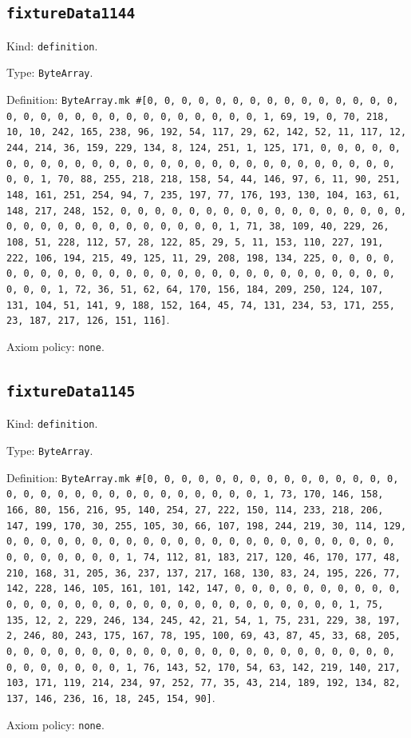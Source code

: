 \documentclass[11pt]{article}
\begin{document}
\subsection*{\texttt{fixtureData1144}}
\noindent Kind: \texttt{definition}.\par
\noindent Type: \texttt{ByteArray}.\par
\noindent Definition: \texttt{ByteArray.mk \#[0, 0, 0, 0, 0, 0, 0, 0, 0, 0, 0, 0, 0, 0, 0, 0, 0, 0, 0, 0, 0, 0, 0, 0, 0, 0, 0, 0, 0, 0, 1, 69, 19, 0, 70, 218, 10, 10, 242, 165, 238, 96, 192, 54, 117, 29, 62, 142, 52, 11, 117, 12, 244, 214, 36, 159, 229, 134, 8, 124, 251, 1, 125, 171, 0, 0, 0, 0, 0, 0, 0, 0, 0, 0, 0, 0, 0, 0, 0, 0, 0, 0, 0, 0, 0, 0, 0, 0, 0, 0, 0, 0, 0, 0, 1, 70, 88, 255, 218, 218, 158, 54, 44, 146, 97, 6, 11, 90, 251, 148, 161, 251, 254, 94, 7, 235, 197, 77, 176, 193, 130, 104, 163, 61, 148, 217, 248, 152, 0, 0, 0, 0, 0, 0, 0, 0, 0, 0, 0, 0, 0, 0, 0, 0, 0, 0, 0, 0, 0, 0, 0, 0, 0, 0, 0, 0, 0, 0, 1, 71, 38, 109, 40, 229, 26, 108, 51, 228, 112, 57, 28, 122, 85, 29, 5, 11, 153, 110, 227, 191, 222, 106, 194, 215, 49, 125, 11, 29, 208, 198, 134, 225, 0, 0, 0, 0, 0, 0, 0, 0, 0, 0, 0, 0, 0, 0, 0, 0, 0, 0, 0, 0, 0, 0, 0, 0, 0, 0, 0, 0, 0, 0, 1, 72, 36, 51, 62, 64, 170, 156, 184, 209, 250, 124, 107, 131, 104, 51, 141, 9, 188, 152, 164, 45, 74, 131, 234, 53, 171, 255, 23, 187, 217, 126, 151, 116]}.\par
\noindent Axiom policy: \texttt{none}.\par
\subsection*{\texttt{fixtureData1145}}
\noindent Kind: \texttt{definition}.\par
\noindent Type: \texttt{ByteArray}.\par
\noindent Definition: \texttt{ByteArray.mk \#[0, 0, 0, 0, 0, 0, 0, 0, 0, 0, 0, 0, 0, 0, 0, 0, 0, 0, 0, 0, 0, 0, 0, 0, 0, 0, 0, 0, 0, 0, 1, 73, 170, 146, 158, 166, 80, 156, 216, 95, 140, 254, 27, 222, 150, 114, 233, 218, 206, 147, 199, 170, 30, 255, 105, 30, 66, 107, 198, 244, 219, 30, 114, 129, 0, 0, 0, 0, 0, 0, 0, 0, 0, 0, 0, 0, 0, 0, 0, 0, 0, 0, 0, 0, 0, 0, 0, 0, 0, 0, 0, 0, 0, 0, 1, 74, 112, 81, 183, 217, 120, 46, 170, 177, 48, 210, 168, 31, 205, 36, 237, 137, 217, 168, 130, 83, 24, 195, 226, 77, 142, 228, 146, 105, 161, 101, 142, 147, 0, 0, 0, 0, 0, 0, 0, 0, 0, 0, 0, 0, 0, 0, 0, 0, 0, 0, 0, 0, 0, 0, 0, 0, 0, 0, 0, 0, 0, 0, 1, 75, 135, 12, 2, 229, 246, 134, 245, 42, 21, 54, 1, 75, 231, 229, 38, 197, 2, 246, 80, 243, 175, 167, 78, 195, 100, 69, 43, 87, 45, 33, 68, 205, 0, 0, 0, 0, 0, 0, 0, 0, 0, 0, 0, 0, 0, 0, 0, 0, 0, 0, 0, 0, 0, 0, 0, 0, 0, 0, 0, 0, 0, 0, 1, 76, 143, 52, 170, 54, 63, 142, 219, 140, 217, 103, 171, 119, 214, 234, 97, 252, 77, 35, 43, 214, 189, 192, 134, 82, 137, 146, 236, 16, 18, 245, 154, 90]}.\par
\noindent Axiom policy: \texttt{none}.\par
\end{document}
